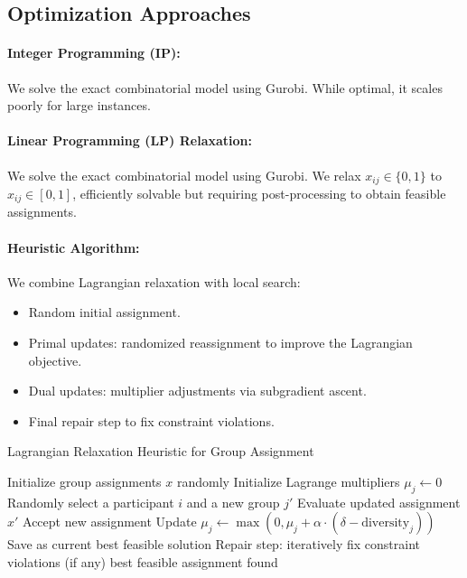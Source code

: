 \subsection*{Optimization Approaches}

\paragraph{Integer Programming (IP):}
We solve the exact combinatorial model using Gurobi. While optimal, it scales poorly for large instances.

\paragraph{Linear Programming (LP) Relaxation:}
We solve the exact combinatorial model using Gurobi. We relax $x_{ij} \in \{0,1\}$ to $x_{ij} \in [0,1]$, efficiently solvable but requiring post-processing to obtain feasible assignments.

\paragraph{Heuristic Algorithm:}
We combine Lagrangian relaxation with local search:
\begin{itemize}
    \item Random initial assignment.
    \item Primal updates: randomized reassignment to improve the Lagrangian objective.
    \item Dual updates: multiplier adjustments via subgradient ascent.
    \item Final repair step to fix constraint violations.
\end{itemize}

\begin{algorithm}[H]
\caption*{Lagrangian Relaxation Heuristic for Group Assignment}
\begin{algorithmic}[1]
\State Initialize group assignments $x$ randomly
\State Initialize Lagrange multipliers $\mu_j \gets 0$
        \State Randomly select a participant $i$ and a new group $j'$
            \State Evaluate updated assignment $x'$
                \State Accept new assignment
            \EndIf
        \EndIf
    \EndFor
        \State Update $\mu_j \gets \max(0, \mu_j + \alpha \cdot (\delta - \text{diversity}_j))$
    \EndFor
        \State Save as current best feasible solution
    \EndIf
\EndFor
\State Repair step: iteratively fix constraint violations (if any)
\State \Return best feasible assignment found
\end{algorithmic}
\end{algorithm}

